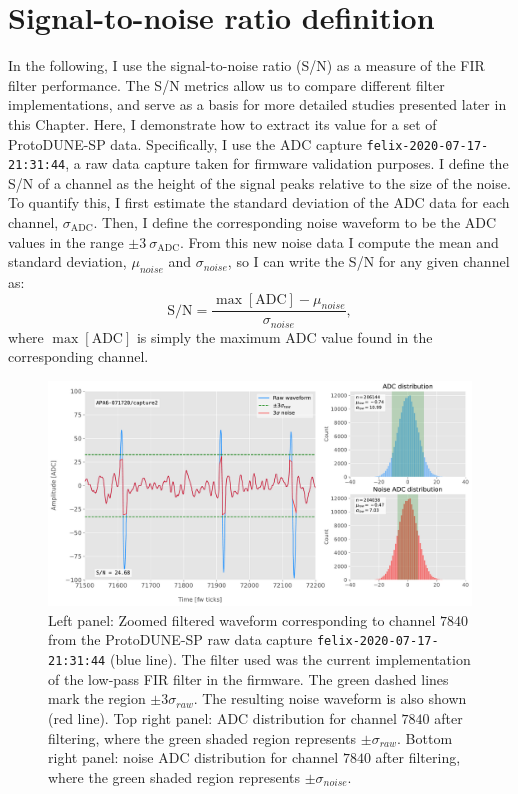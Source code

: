 \section{Signal-to-noise ratio definition}
\label{sec:matched_filter_sn_definition}

In the following, I use the signal-to-noise ratio (S/N) as a measure of the FIR filter performance. The S/N metrics allow us to compare different filter implementations, and serve as a basis for more detailed studies presented later in this Chapter. Here, I demonstrate how to extract its value for a set of ProtoDUNE-SP data. Specifically, I use the ADC capture \texttt{felix-2020-07-17-21:31:44}, a raw data capture taken for firmware validation purposes. I define the S/N of a channel as the height of the signal peaks relative to the size of the noise. To quantify this, I first estimate the standard deviation of the ADC data for each channel, $\sigma_{\mathrm{ADC}}$. Then, I define the corresponding noise waveform to be the ADC values in the range $\pm 3~\sigma_{\mathrm{ADC}}$. From this new noise data I compute the mean and standard deviation, $\mu_{noise}$ and $\sigma_{noise}$, so I can write the S/N for any given channel as:
\begin{equation}
	\mathrm{S/N} = \frac{\max{[\mathrm{ADC}]} - \mu_{noise}}{\sigma_{noise}},
\end{equation}
where $\max{[\mathrm{ADC}]}$ is simply the maximum ADC value found in the corresponding channel.

\begin{figure}[t]
	\centering
	\includegraphics[width=1\linewidth]{Images/Matched_Filter/waveform_example_fir}
	\caption[Example filtered waveform from a ProtoDUNE-SP raw data capture.]{Left panel: Zoomed filtered waveform corresponding to channel $7840$ from the ProtoDUNE-SP raw data capture \texttt{felix-2020-07-17-21:31:44} (blue line). The filter used was the current implementation of the low-pass FIR filter in the firmware. The green dashed lines mark the region $\pm3\sigma_{raw}$. The resulting noise waveform is also shown (red line). Top right panel: ADC distribution for channel $7840$ after filtering, where the green shaded region represents $\pm \sigma_{raw}$. Bottom right panel: noise ADC distribution for channel $7840$ after filtering, where the green shaded region represents $\pm \sigma_{noise}$.}
	\label{fig:adcs_fir}
\end{figure}

